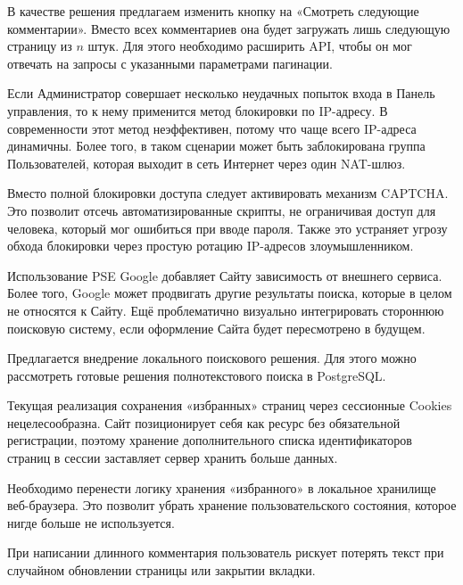 В качестве решения предлагаем изменить кнопку на «Смотреть следующие комментарии». Вместо всех комментариев она будет загружать лишь следующую страницу из \( n \) штук. Для этого необходимо расширить API, чтобы он мог отвечать на запросы с указанными параметрами пагинации.


Если Администратор совершает несколько неудачных попыток входа в Панель управления, то к нему применится метод блокировки по IP-адресу. В современности этот метод неэффективен, потому что чаще всего IP-адреса динамичны. Более того, в таком сценарии может быть заблокирована группа Пользователей, которая выходит в сеть Интернет через один NAT-шлюз.

Вместо полной блокировки доступа следует активировать механизм CAPTCHA. Это позволит отсечь автоматизированные скрипты, не ограничивая доступ для человека, который мог ошибиться при вводе пароля. Также это устраняет угрозу обхода блокировки через простую ротацию IP-адресов злоумышленником.


Использование PSE Google добавляет Сайту зависимость от внешнего сервиса. Более того, Google может продвигать другие результаты поиска, которые в целом не относятся к Сайту. Ещё проблематично визуально интегрировать стороннюю поисковую систему, если оформление Сайта будет пересмотрено в будущем.

Предлагается внедрение локального поискового решения. Для этого можно рассмотреть готовые решения полнотекстового поиска в PostgreSQL.


Текущая реализация сохранения «избранных» страниц через сессионные Cookies нецелесообразна. Сайт позиционирует себя как ресурс без обязательной регистрации, поэтому хранение дополнительного списка идентификаторов страниц в сессии заставляет сервер хранить больше данных.

Необходимо перенести логику хранения «избранного» в локальное хранилище веб-браузера. Это позволит убрать хранение пользовательского состояния, которое нигде больше не используется.


При написании длинного комментария пользователь рискует потерять текст при случайном обновлении страницы или закрытии вкладки.

